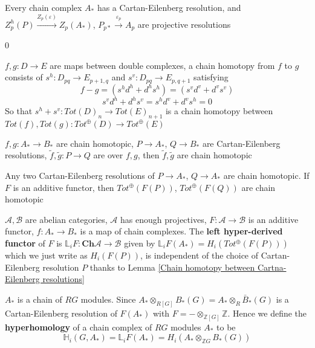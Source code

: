 \documentclass[../main.tex]{subfiles}
\def\CROP{1}
\begin{document}
\begin{lemma}
Every chain complex $A_*$ has a Cartan-Eilenberg resolution, and $Z^h_p(P)\xrightarrow{Z_p(\varepsilon)} Z_p(A_*)$, $P_{p*}\xrightarrow{\varepsilon_p} A_p$ are projective resolutions
\end{lemma}

\if\CROP0
\begin{definition}
$f,g:D\to E$ are maps between double complexes, a chain homotopy from $f$ to $g$ consists of $s^h:D_{pq}\to E_{p+1,q}$ and $s^v:D_{pq}\to E_{p,q+1}$ satisfying
\[f-g=(s^hd^h+d^hs^h)=(s^vd^v+d^vs^v)\]
\[s^vd^h+d^hs^v=s^hd^v+d^vs^h=0\]
So that $s^h+s^v:Tot(D)_n\to Tot(E)_{n+1}$ is a chain homotopy between $Tot(f),Tot(g):Tot^\oplus(D)\to Tot^\oplus(E)$
\end{definition}
\fi

\begin{lemma}\label{Chain homotopy between Cartna-Eilenberg resolutions}
$f,g:A_*\to B_*$ are chain homotopic, $P\to A_*$, $Q\to B_*$ are Cartan-Eilenberg resolutions, $\tilde f,\tilde g:P\to Q$ are over $f,g$, then $\tilde f,\tilde g$ are chain homotopic \par
Any two Cartan-Eilenberg resolutions of $P\to A_*$, $Q\to A_*$ are chain homotopic. If $F$ is an additive functor, then $Tot^\oplus(F(P))$, $Tot^\oplus(F(Q))$ are chain homotopic
\end{lemma}

\begin{definition}
$\mathcal A,\mathcal B$ are abelian categories, $\mathcal A$ has enough projectives, $F:\mathcal A\to\mathcal B$ is an additive functor, $f:A_*\to B_*$ is a map of chain complexes. The \textbf{left hyper-derived functor} of $F$ is $\mathbb L_iF:\mathbf{Ch}\mathcal A\to \mathcal B$  given by $\mathbb L_iF(A_*)=H_i(Tot^\oplus(F(P)))$ which we just write as $H_i(F(P))$, is independent of the choice of Cartan-Eilenberg resolution $P$ thanks to Lemma \ref{Chain homotopy between Cartna-Eilenberg resolutions}
\end{definition}

\begin{definition}
$A_*$ is a chain of $RG$ modules. Since $A_*\otimes_{R[G]}B_*(G)=A_*\otimes_{R} \bar B_*(G)$ is a Cartan-Eilenberg resolution of $F(A_*)$ with $F=-\otimes_{\mathbb Z[G]}\mathbb Z$. Hence we define the \textbf{hyperhomology} of a chain complex of $RG$ modules $A_*$ to be
\[\mathbb H_i(G,A_*)=\mathbb L_iF(A_*)=H_i(A_*\otimes_{\mathbb ZG}B_*(G))\]
\end{definition}
\end{document}
